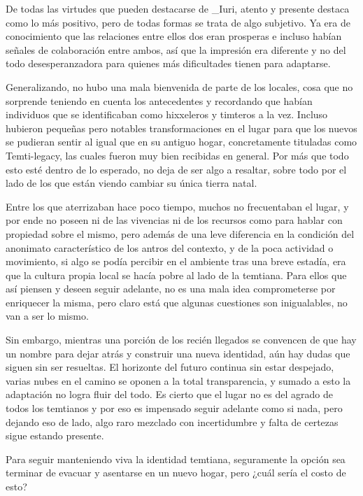 \documentclass[
  spanish,
]{book}
\begin{document}
De todas las virtudes que pueden destacarse de \_Iuri, atento y presente destaca como lo más positivo, pero de todas formas se trata de algo subjetivo. Ya era de conocimiento que las relaciones entre ellos dos eran prosperas e incluso habían señales de colaboración entre ambos, así que la impresión era diferente y no del todo desesperanzadora para quienes más dificultades tienen para adaptarse.

Generalizando, no hubo una mala bienvenida de parte de los locales, cosa que no sorprende teniendo en cuenta los antecedentes y recordando que habían individuos que se identificaban como hixxeleros y timteros a la vez. Incluso hubieron pequeñas pero notables transformaciones en el lugar para que los nuevos se pudieran sentir al igual que en su antiguo hogar, concretamente tituladas como Temti-legacy, las cuales fueron muy bien recibidas en general. Por más que todo esto esté dentro de lo esperado, no deja de ser algo a resaltar, sobre todo por el lado de los que están viendo cambiar su única tierra natal.

Entre los que aterrizaban hace poco tiempo, muchos no frecuentaban el lugar, y por ende no poseen ni de las vivencias ni de los recursos como para hablar con propiedad sobre el mismo, pero además de una leve diferencia en la condición del anonimato característico de los antros del contexto, y de la poca actividad o movimiento, si algo se podía percibir en el ambiente tras una breve estadía, era que la cultura propia local se hacía pobre al lado de la temtiana. Para ellos que así piensen y deseen seguir adelante, no es una mala idea comprometerse por enriquecer la misma, pero claro está que algunas cuestiones son inigualables, no van a ser lo mismo.

Sin embargo, mientras una porción de los recién llegados se convencen de que hay un nombre para dejar atrás y construir una nueva identidad, aún hay dudas que siguen sin ser resueltas. El horizonte del futuro continua sin estar despejado, varias nubes en el camino se oponen a la total transparencia, y sumado a esto la adaptación no logra fluir del todo. Es cierto que el lugar no es del agrado de todos los temtianos y por eso es impensado seguir adelante como si nada, pero dejando eso de lado, algo raro mezclado con incertidumbre y falta de certezas sigue estando presente.

Para seguir manteniendo viva la identidad temtiana, seguramente la opción sea terminar de evacuar y asentarse en un nuevo hogar, pero ¿cuál sería el costo de esto?
\end{document}
